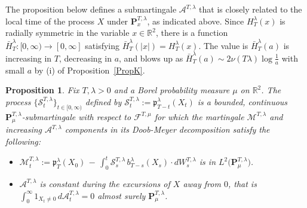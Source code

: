 \documentclass[10pt]{article}
\numberwithin{equation}{section}
\newtheorem{proposition}[theorem]{Proposition}
\theoremstyle{definition}
\newcommand{\R}{{\mathbb R}}
\begin{document}
The proposition below defines a submartingale $\mathcal{A}^{T,\lambda}$ that is closely related to the local time of the process $X$ under $\mathbf{P}_{x  }^{T,\lambda}$, as indicated above. Since $H_T^{\lambda}(x)$ is radially symmetric in the variable $x\in \R^2$, there is a function $\bar{H}_T^{\lambda}:[0,\infty)\rightarrow [0,\infty]$ satisfying $\bar{H}_T^{\lambda}(|x|)=H_T^{\lambda}(x)$. The value is $\bar{H}_T^{\lambda}(a)$ is increasing in $T$, decreasing in $a$, and blows up as $\bar{H}_T^{\lambda}(a)\sim 2\nu(T\lambda)\log \frac{1}{a}$ with small $a$ by (i) of Proposition~\ref{PropK}. 
\begin{proposition} \label{PropSubMart}  Fix $T,\lambda > 0$ and a Borel probability measure $\mu$  on $\R^2 $. The process $\{\mathcal{S}_{t}^{T,\lambda}\}_{t\in [0,\infty)}$ defined by $\mathcal{S}_{t}^{T,\lambda}:=\mathfrak{p}_{T-t}^{\lambda}(X_t)$ is a bounded, continuous $\mathbf{P}^{T,\lambda}_{\mu}$-submartingale with respect to $\mathscr{F}^{T,\mu}$ for which the martingale $\mathcal{M}^{T,\lambda}$ and increasing $\mathcal{A}^{T,\lambda}$ components in its Doob-Meyer decomposition satisfy the following:
\begin{itemize}
    \item  $\mathcal{M}_{t}^{T,\lambda}:=\mathfrak{p}_{T}^{\lambda}(X_0)\,-\,\int_0^t\mathcal{S}_{s}^{T,\lambda}\,b_{T-s}^{\lambda}(X_s) \cdot dW_{s}^{T,\lambda}$ is in $L^2\big(\mathbf{P}^{T,\lambda}_{\mu}\big)$.


    \item  $\mathcal{A}^{T,\lambda}$ is constant during the excursions of $X$ away from $0$, that is
$  \int_0^{\infty}1_{X_t\neq 0}\,d\mathcal{A}_{t}^{T,\lambda}=0  $  almost surely $\mathbf{P}_{\mu }^{T,\lambda}$.
\end{itemize}
\end{proposition}
\end{document}
